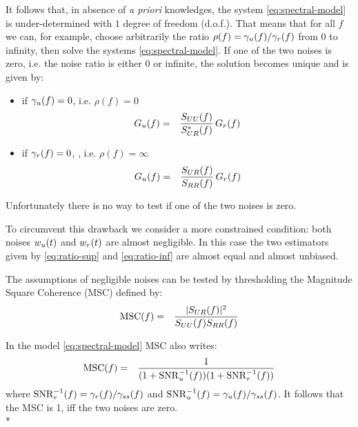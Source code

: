 It follows that, in absence of {\it a priori} knowledges,  the system \eqref{eq:spectral-model} is under-determined with $1$ degree of freedom (d.o.f.). That means that for all $f$ we can, for example,  choose arbitrarily the ratio $\rho(f)=\gamma_{{u}}(f)/\gamma_{{r}}(f)$ from $0$ to infinity, then solve the systems \eqref{eq:spectral-model}. If one of the two noises is zero, i.e. the noise ratio is either 0 or infinite, the solution becomes unique and is given by:
\begin{itemize}
\item
if $\gamma_{{u}}(f)=0$, i.e. $\rho(f)=0$
\begin{eqnarray}
\label{eq:ratio-sup}
G_{{u}}(f)&=&
\frac{S_{UU}(f)}{S_{UR}^*(f)}\,G_{{r}}(f)
\end{eqnarray}
\item
if $\gamma_{{r}}(f)=0$, , i.e. $\rho(f)=\infty$
\begin{eqnarray}
\label{eq:ratio-inf}
G_{{u}}(f)&=&
\frac{S_{UR}(f)}{S_{RR}(f)}\,G_{{r}}(f)
\end{eqnarray}
\end{itemize}
 Unfortunately there is no way to test if one of the two noises is zero.


To circumvent this drawback we consider a more constrained condition: both noises $w_{{u}}(t)$ and $w_{{r}}(t)$ are almost negligible. In this case the two estimators given by \eqref{eq:ratio-sup} and \eqref{eq:ratio-inf} are almost equal and almost unbiased. 

The assumptions of negligible noises can be tested by thresholding the Magnitude Square Coherence (MSC) defined by:
\begin{eqnarray}
 \label{eq:MSC-continuous-frequency}
 \mathrm{MSC}(f) &=& \frac{|S_{UR}(f)|^{2}}{S_{UU}(f)S_{RR}(f)}
\end{eqnarray}
 
In the model \eqref{eq:spectral-model} MSC also writes:
\begin{eqnarray}
\label{eq:coherence-in-our-model}
 \mathrm{MSC}(f) &=& \frac{1}{(1+\mathrm{SNR}^{-1}_{{u}}(f))(1+\mathrm{SNR}^{-1}_{{r}}(f))}
\end{eqnarray}
where $\mathrm{SNR}^{-1}_{{r}}(f)=\gamma_{{r}}(f)/\gamma_{ss}(f)$ and $\mathrm{SNR}^{-1}_{{u}}(f)=\gamma_{{u}}(f)/\gamma_{ss}(f)$. It follows that the MSC is 1, iff the two noises are zero.\\*



